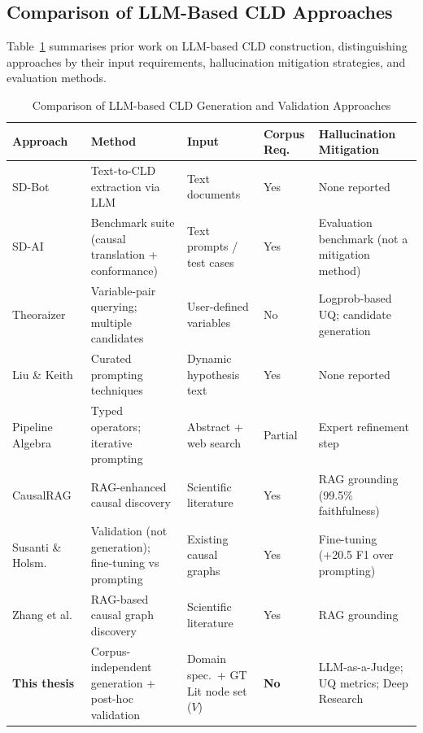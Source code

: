 \subsection{Comparison of LLM-Based CLD Approaches}

Table~\ref{tab:prior_cld_work} summarises prior work on LLM-based CLD construction, distinguishing approaches by their input requirements, hallucination mitigation strategies, and evaluation methods.

\begin{table}[H]
\centering
\caption[LLM-based CLD generation approaches]{Comparison of LLM-based CLD Generation and Validation Approaches}
\label{tab:prior_cld_work}
\footnotesize
\begin{tabular}{p{2.0cm}p{2.4cm}p{1.8cm}p{1.5cm}p{3.0cm}}
\toprule
\textbf{Approach} & \textbf{Method} & \textbf{Input} & \textbf{Corpus Req.} & \textbf{Hallucination Mitigation} \\
\midrule
SD-Bot~\citep{hosseinichimeh2024textmapdynamicsbot} & Text-to-CLD extraction via LLM & Text documents & Yes & None reported \\
\midrule
SD-AI~\citep{schoenberg2025aibuildsdmodels} & Benchmark suite (causal translation + conformance) & Text prompts / test cases & Yes & Evaluation benchmark (not a mitigation method) \\
\midrule
Theoraizer~\citep{Waaijers2024theoraizer} & Variable-pair querying; multiple candidates & User-defined variables & No & Logprob-based UQ; candidate generation \\
\midrule
Liu \& Keith~\citep{liu2025leveraging} & Curated prompting techniques & Dynamic hypothesis text & Yes & None reported \\
\midrule
Pipeline Algebra~\citep{reinholtz2025pipelinealgebra} & Typed operators; iterative prompting & Abstract + web search & Partial & Expert refinement step \\
\midrule
CausalRAG~\citep{wang2025causalrag} & RAG-enhanced causal discovery & Scientific literature & Yes & RAG grounding (99.5\% faithfulness) \\
\midrule
Susanti \& Holsm.~\citep{susanti2024prompting} & Validation (not generation); fine-tuning vs prompting & Existing causal graphs & Yes & Fine-tuning (+20.5 F1 over prompting) \\
\midrule
Zhang et al.~\citep{zhang2024causal} & RAG-based causal graph discovery & Scientific literature & Yes & RAG grounding \\
\midrule
\textbf{This thesis} & Corpus-independent generation + post-hoc validation & Domain spec.\ + GT Lit node set ($V$) & \textbf{No} & LLM-as-a-Judge; UQ metrics; Deep Research \\
\bottomrule
\end{tabular}
\end{table}

